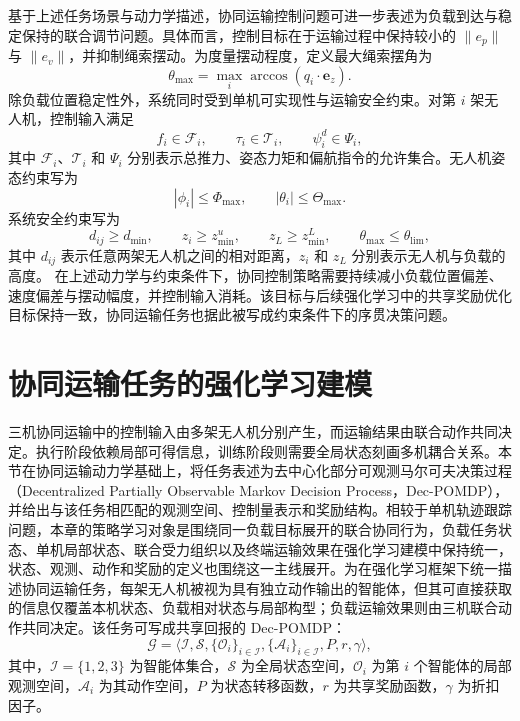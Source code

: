 基于上述任务场景与动力学描述，协同运输控制问题可进一步表述为负载到达与稳定保持的联合调节问题。具体而言，控制目标在于运输过程中保持较小的 $\|e_p\|$ 与 $\|e_v\|$，并抑制绳索摆动。为度量摆动程度，定义最大绳索摆角为
\begin{equation}
    \theta_{\max} = \max_i \arccos(q_i\cdot \mathbf e_z).
\end{equation}
除负载位置稳定性外，系统同时受到单机可实现性与运输安全约束。对第 $i$ 架无人机，控制输入满足
\begin{equation}
    f_i \in \mathcal F_i,\qquad
    \tau_i \in \mathcal T_i,\qquad
    \psi_i^d \in \Psi_i,
\end{equation}
其中 $\mathcal F_i$、$\mathcal T_i$ 和 $\Psi_i$ 分别表示总推力、姿态力矩和偏航指令的允许集合。无人机姿态约束写为
\begin{equation}
    |\phi_i| \le \Phi_{\max},\qquad
    |\theta_i| \le \Theta_{\max}.
\end{equation}
系统安全约束写为
\begin{equation}
    d_{ij}\ge d_{\min},\qquad
    z_i \ge z_{\min}^u,\qquad
    z_L \ge z_{\min}^L,\qquad
    \theta_{\max}\le \theta_{\mathrm{lim}},
\end{equation}
其中 $d_{ij}$ 表示任意两架无人机之间的相对距离，$z_i$ 和 $z_L$ 分别表示无人机与负载的高度。
在上述动力学与约束条件下，协同控制策略需要持续减小负载位置偏差、速度偏差与摆动幅度，并控制输入消耗。该目标与后续强化学习中的共享奖励优化目标保持一致，协同运输任务也据此被写成约束条件下的序贯决策问题。

\section{协同运输任务的强化学习建模}

三机协同运输中的控制输入由多架无人机分别产生，而运输结果由联合动作共同决定。执行阶段依赖局部可得信息，训练阶段则需要全局状态刻画多机耦合关系。本节在协同运输动力学基础上，将任务表述为去中心化部分可观测马尔可夫决策过程（Decentralized Partially Observable Markov Decision Process，Dec-POMDP），并给出与该任务相匹配的观测空间、控制量表示和奖励结构。相较于单机轨迹跟踪问题，本章的策略学习对象是围绕同一负载目标展开的联合协同行为，负载任务状态、单机局部状态、联合受力组织以及终端运输效果在强化学习建模中保持统一，状态、观测、动作和奖励的定义也围绕这一主线展开。为在强化学习框架下统一描述协同运输任务，每架无人机被视为具有独立动作输出的智能体，但其可直接获取的信息仅覆盖本机状态、负载相对状态与局部构型；负载运输效果则由三机联合动作共同决定。该任务可写成共享回报的 Dec-POMDP：
\begin{equation}
    \mathcal G=\langle \mathcal I,\mathcal S,\{\mathcal O_i\}_{i\in\mathcal I},
    \{\mathcal A_i\}_{i\in\mathcal I},P,r,\gamma\rangle,
\end{equation}
其中，$\mathcal I=\{1,2,3\}$ 为智能体集合，$\mathcal S$ 为全局状态空间，$\mathcal O_i$ 为第 $i$ 个智能体的局部观测空间，$\mathcal A_i$ 为其动作空间，$P$ 为状态转移函数，$r$ 为共享奖励函数，$\gamma$ 为折扣因子。

